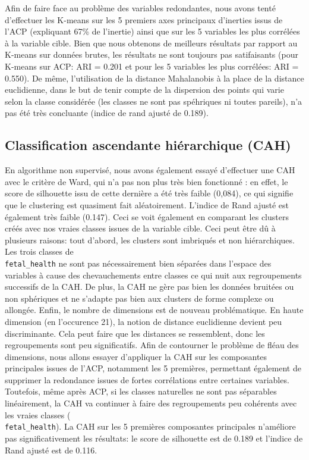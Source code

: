\documentclass[twocolumn,10pt]{article}
\begin{document}
Afin de faire face au problème des variables redondantes, nous avons tenté d'effectuer les K-means sur les 5 premiers axes principaux d'inerties issus de l'ACP (expliquant 67\% de l'inertie) ainsi que sur les 5 variables les plus corrélées à la variable cible. Bien que nous obtenons de meilleurs résultats par rapport au K-means sur données brutes, les résultats ne sont toujours pas satifaisants (pour K-means sur ACP: ARI = 0.201 et pour les 5 variables les plus corrélées: ARI = 0.550). 
De même, l'utilisation de la distance Mahalanobis à la place de la distance euclidienne, dans le but de tenir compte de la dispersion des points qui varie selon la classe considérée (les classes ne sont pas spéhriques ni toutes pareils), n'a pas été très concluante (indice de rand ajusté de 0.189).


\subsection{Classification ascendante hiérarchique (CAH)}\label{subsec:non_sup:cah}

En algorithme non supervisé, nous avons également essayé d'effectuer une CAH avec le critère de Ward, qui n'a pas non plus très bien fonctionné : en effet, le score de silhouette issu de cette dernière a été très faible (0,084), ce qui signifie que le clustering est quasiment fait aléatoirement. L'indice de Rand ajusté est également très faible (0.147). Ceci se voit également en comparant les clusters créés avec nos vraies classes issues de la variable cible.
Ceci peut être dû à plusieurs raisons: tout d’abord, les clusters sont imbriqués et non hiérarchiques. Les trois classes de \\\texttt{fetal\_health} ne sont pas nécessairement bien séparées dans l’espace des variables à cause des chevauchements entre classes ce qui nuit aux regroupements successifs de la CAH. De plus, la CAH ne gère pas bien les données bruitées ou non sphériques et ne s’adapte pas bien aux clusters de forme complexe ou allongée. Enfin, le nombre de dimensions est de nouveau problématique. En haute dimension (en l'occurence 21), la notion de distance euclidienne devient peu discriminante. Cela peut faire que les distances se ressemblent, donc les regroupements sont peu significatifs.
Afin de contourner le problème de fléau des dimensions, nous allons essayer d’appliquer la CAH sur les composantes principales issues de l’ACP, notamment les 5 premières, permettant également de supprimer la redondance issues de fortes corrélations entre certaines variables. Toutefois, même après ACP,  si les classes naturelles ne sont pas séparables linéairement, la CAH va continuer à faire des regroupements peu cohérents avec les vraies classes (\\\texttt{fetal\_health}). La CAH sur les 5 premières composantes principales n'améliore pas significativement les résultats: le score de silhouette est de 0.189 et l'indice de Rand ajusté est de 0.116.
\end{document}
